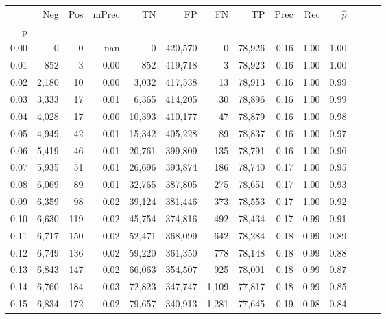 \begin{tabular}{rrrrrrrrrrrrrr}
\toprule
{} &    Neg &    Pos & mPrec &       TN &       FP &      FN &      TP &  Prec &   Rec & $\hat{p}$ \\
p    &        &        &       &          &          &         &         &       &       &           \\
\midrule
0.00 &      0 &      0 &   nan &        0 &  420,570 &       0 &  78,926 &  0.16 &  1.00 &      1.00 \\
0.01 &    852 &      3 &  0.00 &      852 &  419,718 &       3 &  78,923 &  0.16 &  1.00 &      1.00 \\
0.02 &  2,180 &     10 &  0.00 &    3,032 &  417,538 &      13 &  78,913 &  0.16 &  1.00 &      0.99 \\
0.03 &  3,333 &     17 &  0.01 &    6,365 &  414,205 &      30 &  78,896 &  0.16 &  1.00 &      0.99 \\
0.04 &  4,028 &     17 &  0.00 &   10,393 &  410,177 &      47 &  78,879 &  0.16 &  1.00 &      0.98 \\
0.05 &  4,949 &     42 &  0.01 &   15,342 &  405,228 &      89 &  78,837 &  0.16 &  1.00 &      0.97 \\
0.06 &  5,419 &     46 &  0.01 &   20,761 &  399,809 &     135 &  78,791 &  0.16 &  1.00 &      0.96 \\
0.07 &  5,935 &     51 &  0.01 &   26,696 &  393,874 &     186 &  78,740 &  0.17 &  1.00 &      0.95 \\
0.08 &  6,069 &     89 &  0.01 &   32,765 &  387,805 &     275 &  78,651 &  0.17 &  1.00 &      0.93 \\
0.09 &  6,359 &     98 &  0.02 &   39,124 &  381,446 &     373 &  78,553 &  0.17 &  1.00 &      0.92 \\
0.10 &  6,630 &    119 &  0.02 &   45,754 &  374,816 &     492 &  78,434 &  0.17 &  0.99 &      0.91 \\
0.11 &  6,717 &    150 &  0.02 &   52,471 &  368,099 &     642 &  78,284 &  0.18 &  0.99 &      0.89 \\
0.12 &  6,749 &    136 &  0.02 &   59,220 &  361,350 &     778 &  78,148 &  0.18 &  0.99 &      0.88 \\
0.13 &  6,843 &    147 &  0.02 &   66,063 &  354,507 &     925 &  78,001 &  0.18 &  0.99 &      0.87 \\
0.14 &  6,760 &    184 &  0.03 &   72,823 &  347,747 &   1,109 &  77,817 &  0.18 &  0.99 &      0.85 \\
0.15 &  6,834 &    172 &  0.02 &   79,657 &  340,913 &   1,281 &  77,645 &  0.19 &  0.98 &      0.84 \\

\end{tabular}
